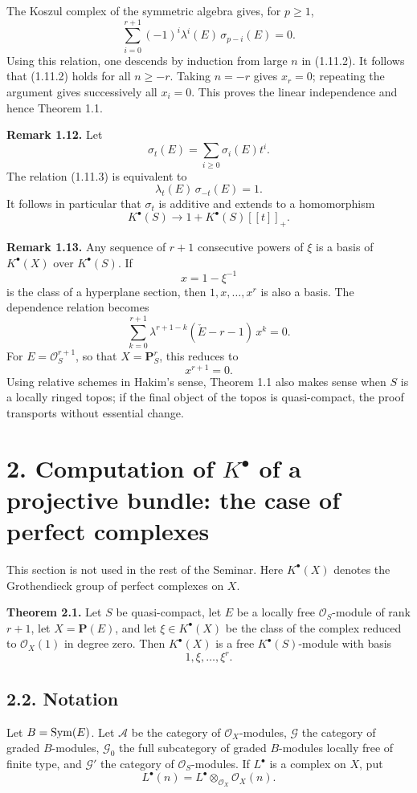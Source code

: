 \documentclass[11pt]{article}
\begin{document}
The Koszul complex of the symmetric algebra gives, for \(p\geq 1\),
\begin{equation}\tag{1.11.3}
  \sum_{i=0}^{r+1}(-1)^i\lambda^i(E)\,\sigma_{p-i}(E)=0 .
\end{equation}
Using this relation, one descends by induction from large \(n\) in (1.11.2). It follows that (1.11.2) holds for all \(n\geq -r\). Taking \(n=-r\) gives \(x_r=0\); repeating the argument gives successively all \(x_i=0\). This proves the linear independence and hence Theorem 1.1.

\textbf{Remark 1.12.} Let
\[
  \sigma_t(E)=\sum_{i\geq 0}\sigma_i(E)t^i .
\]
The relation (1.11.3) is equivalent to
\[
  \lambda_t(E)\,\sigma_{-t}(E)=1.
\]
It follows in particular that \(\sigma_t\) is additive and extends to a homomorphism
\[
  K^\bullet(S)\longrightarrow 1+K^\bullet(S)[[t]]_+ .
\]

\textbf{Remark 1.13.} Any sequence of \(r+1\) consecutive powers of \(\xi\) is a basis of \(K^\bullet(X)\) over \(K^\bullet(S)\). If
\[
  x=1-\xi^{-1}
\]
is the class of a hyperplane section, then \(1,x,\ldots,x^r\) is also a basis. The dependence relation becomes
\begin{equation}\tag{1.13.1}
  \sum_{k=0}^{r+1}\lambda^{r+1-k}(\check E-r-1)\,x^k=0.
\end{equation}
For \(E=\mathcal O_S^{r+1}\), so that \(X=\mathbf P^r_S\), this reduces to
\[
  x^{r+1}=0.
\]
Using relative schemes in Hakim's sense, Theorem 1.1 also makes sense when \(S\) is a locally ringed topos; if the final object of the topos is quasi-compact, the proof transports without essential change.

\section*{2. Computation of \(K^\bullet\) of a projective bundle: the case of perfect complexes}

This section is not used in the rest of the Seminar. Here \(K^\bullet(X)\) denotes the Grothendieck group of perfect complexes on \(X\).

\textbf{Theorem 2.1.} Let \(S\) be quasi-compact, let \(E\) be a locally free \(\mathcal O_S\)-module of rank \(r+1\), let \(X=\mathbf P(E)\), and let \(\xi\in K^\bullet(X)\) be the class of the complex reduced to \(\mathcal O_X(1)\) in degree zero. Then \(K^\bullet(X)\) is a free \(K^\bullet(S)\)-module with basis
\[
  1,\xi,\ldots,\xi^r .
\]

\subsection*{2.2. Notation}
Let \(B=\operatorname{Sym}(E)\). Let \(\mathcal A\) be the category of \(\mathcal O_X\)-modules, \(\mathcal G\) the category of graded \(B\)-modules, \(\mathcal G_0\) the full subcategory of graded \(B\)-modules locally free of finite type, and \(\mathcal G'\) the category of \(\mathcal O_S\)-modules. If \(L^\bullet\) is a complex on \(X\), put
\[
  L^\bullet(n)=L^\bullet\otimes_{\mathcal O_X}\mathcal O_X(n).
\]
\end{document}
